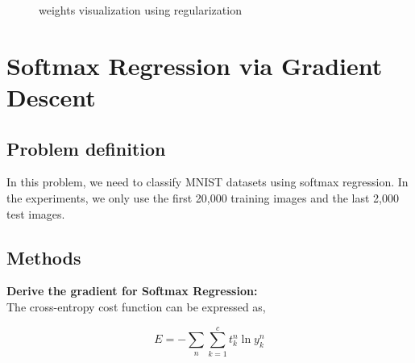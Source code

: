 \documentclass{article} %
\begin{document}
\begin{figure}
	\qquad
	\caption{weights visualization using regularization}%
	\label{fig:P10}%
\end{figure}

\section{Softmax Regression via Gradient Descent}
\subsection{Problem definition}
In this problem, we need to classify MNIST datasets using softmax regression. In the experiments, we only use the first 20,000 training images and the last 2,000 test images.

\subsection{Methods}
\textbf{Derive the gradient for Softmax Regression:} \\
The cross-entropy cost function can be expressed as,

\begin{equation}
	E = - \sum_{n}\sum_{k=1}^{c}t_k^n\ln y_k^n
\end{equation}
\end{document}
